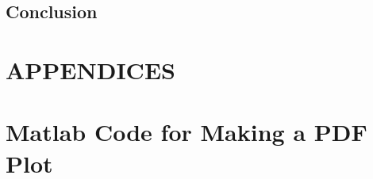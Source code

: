 \documentclass[letterpaper,12pt,titlepage,oneside,final]{book}
\theoremstyle{plain}
\let\origdoublepage\cleardoublepage
\newcommand{\clearemptydoublepage}{%
  \clearpage{\pagestyle{empty}\origdoublepage}}
\let\cleardoublepage\clearemptydoublepage
\begin{document}
\section{Conclusion}



\appendix

\chapter*{APPENDICES}
\chapter[PDF Plots From Matlab]{Matlab Code for Making a PDF Plot}
\label{AppendixA}





\cleardoublepage %
\renewcommand*{\bibname}{References}




\nocite{*}
\end{document}
